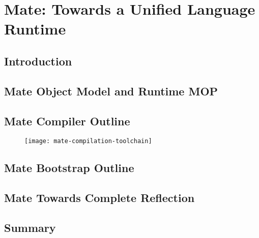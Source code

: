 

\chapter{Mate: Towards a Unified Language Runtime}
\minitoc


\section{Introduction}


\section{Mate Object Model and Runtime MOP}



\section{Mate Compiler Outline}

\begin{figure}
\centering
	\texttt{[image: mate-compilation-toolchain]}
\end{figure}

\section{Mate Bootstrap Outline}



\section{Mate Towards Complete Reflection}


\section{Summary}


